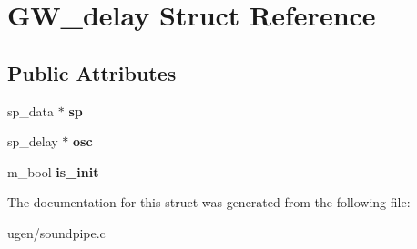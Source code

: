 \hypertarget{structGW__delay}{}\section{G\+W\+\_\+delay Struct Reference}
\label{structGW__delay}
\subsection*{Public Attributes}
\begin{DoxyCompactItemize}
\item 
\hypertarget{structGW__delay_af9913f53a2066b6970e08127dd8cd235}{}\label{structGW__delay_af9913f53a2066b6970e08127dd8cd235} 
sp\+\_\+data $\ast$ {\bfseries sp}
\item 
\hypertarget{structGW__delay_ae75279216587e5d891538b890c4b7a5a}{}\label{structGW__delay_ae75279216587e5d891538b890c4b7a5a} 
sp\+\_\+delay $\ast$ {\bfseries osc}
\item 
\hypertarget{structGW__delay_a4a4ea8773fd3e6c7b3b90e813c603cca}{}\label{structGW__delay_a4a4ea8773fd3e6c7b3b90e813c603cca} 
m\+\_\+bool {\bfseries is\+\_\+init}
\end{DoxyCompactItemize}


The documentation for this struct was generated from the following file\+:\begin{DoxyCompactItemize}
\item 
ugen/soundpipe.\+c\end{DoxyCompactItemize}
